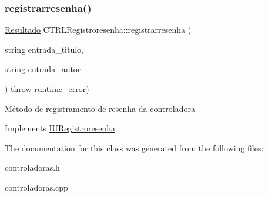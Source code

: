 \subsubsection{\texorpdfstring{registrarresenha()}{registrarresenha()}}
{\footnotesize\ttfamily \hyperlink{classResultado}{Resultado} C\+T\+R\+L\+Registroresenha\+::registrarresenha (\begin{DoxyParamCaption}\item[{string}]{entrada\+\_\+titulo,  }\item[{string}]{entrada\+\_\+autor }\end{DoxyParamCaption}) throw  runtime\+\_\+error) \hspace{0.3cm}{\ttfamily [virtual]}}

Método de registramento de resenha da controladora 

Implements \hyperlink{classIURegistroresenha}{I\+U\+Registroresenha}.



The documentation for this class was generated from the following files\+:\begin{DoxyCompactItemize}
\item 
controladoras.\+h\item 
controladoras.\+cpp\end{DoxyCompactItemize}

